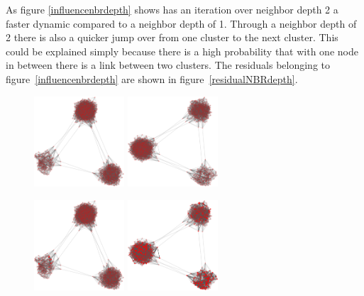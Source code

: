 As figure \ref{influencenbrdepth} shows has an iteration over neighbor depth 2
a faster dynamic compared to a neighbor depth of 1. Through a neighbor depth of
2 there is also a quicker jump over from one cluster to the next cluster. This
could be explained simply because there is a high probability that with one
node in between there is a link between two clusters. The residuals belonging
to figure~\ref{influencenbrdepth} are shown in figure~\ref{residualNBRdepth}.

\begin{figure}
\centering
\includegraphics[width=0.3\textwidth]{batchRun__kHalf=6-6-6_maxUpdate=0.02_noize=0_nbrDepth=1/network0-crop.pdf}
\hskip2cm
\includegraphics[width=0.3\textwidth]{batchRun__kHalf=6-6-6_maxUpdate=0.02_noize=0_nbrDepth=2/network0-crop.pdf}

\includegraphics[width=0.3\textwidth]{batchRun__kHalf=6-6-6_maxUpdate=0.02_noize=0_nbrDepth=1/network250-crop.pdf}
\hskip2cm
\includegraphics[width=0.3\textwidth]{batchRun__kHalf=6-6-6_maxUpdate=0.02_noize=0_nbrDepth=2/network250-crop.pdf}


\end{figure}
